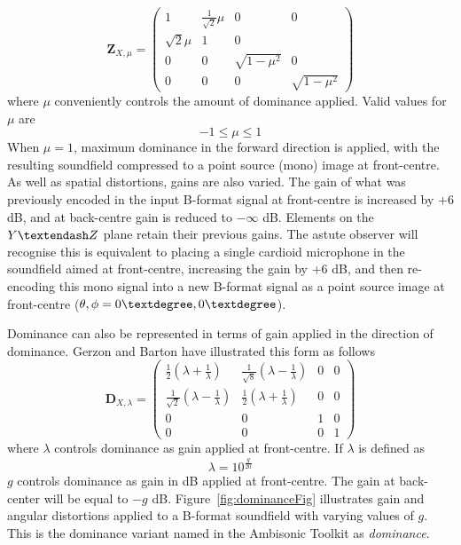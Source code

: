 \documentclass[12pt]{article}
\begin{document}
\begin{equation}
\mathbf{Z}_{X, \mu} = \begin{pmatrix}
	1 & \frac{1}{\sqrt{2}}\mu & 0 & 0\\
	\sqrt{2}\mu & 1 & 0\\
	0 & 0 & \sqrt{1-\mu^2} & 0\\
	0 & 0 & 0 & \sqrt{1-\mu^2}
\end{pmatrix}
\end{equation} where \(\mu\) conveniently controls the amount of dominance applied. Valid values for \(\mu\) are \begin{equation}
-1 \leq \mu \leq 1
\end{equation} When \(\mu = 1\), maximum dominance in the forward direction is applied, with the resulting soundfield compressed to a point source (mono) image at front-centre. As well as spatial distortions, gains are also varied. The gain of what was previously encoded in the input B-format signal at front-centre is increased by \(+6\) dB, and at back-centre gain is reduced to \(-\infty\) dB. Elements on the \(Y \textendash Z\) plane retain their previous gains. The astute observer will recognise this is equivalent to placing a single cardioid microphone in the soundfield aimed at front-centre, increasing the gain by \(+6\) dB, and then re-encoding this mono signal into a new B-format signal as a point source image at front-centre (\(\theta, \phi = 0\textdegree, 0\textdegree\)).

Dominance can also be represented in terms of gain applied in the direction of dominance. Gerzon and Barton \cite{gerzon-barton:92} have illustrated this form as follows \begin{equation}
\mathbf{D}_{X, \lambda} = \begin{pmatrix}		\label{eq:lamb_dom}
	\frac{1}{2}(\lambda + \frac{1}{\lambda}) & \frac{1}{\sqrt{8}}(\lambda - \frac{1}{\lambda}) & 0 & 0\\
	\frac{1}{\sqrt{2}}(\lambda - \frac{1}{\lambda}) & \frac{1}{2}(\lambda + \frac{1}{\lambda}) & 0 & 0\\
	0 & 0 & 1 & 0\\
	0 & 0 & 0 & 1
\end{pmatrix}
\end{equation} where \(\lambda\) controls dominance as gain applied at front-centre. If \(\lambda\) is defined as \begin{equation}
	\lambda = 10^\frac{g}{20}
\end{equation} \(g\) controls dominance as gain in dB applied at front-centre. The gain at back-center will be equal to \(-g\) dB. Figure~\ref{fig:dominanceFig} illustrates gain and angular distortions applied to a B-format soundfield with varying values of \(g\). This is the dominance variant named in the Ambisonic Toolkit as {\em dominance}.
\end{document}
